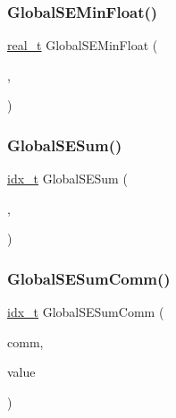 \mbox{\label{a00951_a46d61b08168ee73968b264b47500af16}} 
\subsubsection{\texorpdfstring{Global\+S\+E\+Min\+Float()}{GlobalSEMinFloat()}}
{\footnotesize\ttfamily \hyperlink{a00876_a1924a4f6907cc3833213aba1f07fcbe9}{real\+\_\+t} Global\+S\+E\+Min\+Float (\begin{DoxyParamCaption}\item[{\hyperlink{a00742}{ctrl\+\_\+t} $\ast$}]{,  }\item[{\hyperlink{a00876_a1924a4f6907cc3833213aba1f07fcbe9}{real\+\_\+t}}]{ }\end{DoxyParamCaption})}

\mbox{\label{a00951_a67fc9d98a87f543ecb9af4c3738d1c58}} 
\subsubsection{\texorpdfstring{Global\+S\+E\+Sum()}{GlobalSESum()}}
{\footnotesize\ttfamily \hyperlink{a00876_aaa5262be3e700770163401acb0150f52}{idx\+\_\+t} Global\+S\+E\+Sum (\begin{DoxyParamCaption}\item[{\hyperlink{a00742}{ctrl\+\_\+t} $\ast$}]{,  }\item[{\hyperlink{a00876_aaa5262be3e700770163401acb0150f52}{idx\+\_\+t}}]{ }\end{DoxyParamCaption})}

\mbox{\label{a00951_a10c4011516ef455e5c128a4112cf2cea}} 
\subsubsection{\texorpdfstring{Global\+S\+E\+Sum\+Comm()}{GlobalSESumComm()}}
{\footnotesize\ttfamily \hyperlink{a00876_aaa5262be3e700770163401acb0150f52}{idx\+\_\+t} Global\+S\+E\+Sum\+Comm (\begin{DoxyParamCaption}\item[{M\+P\+I\+\_\+\+Comm}]{comm,  }\item[{\hyperlink{a00876_aaa5262be3e700770163401acb0150f52}{idx\+\_\+t}}]{value }\end{DoxyParamCaption})}

